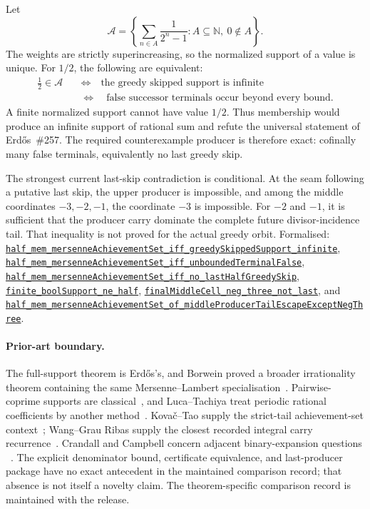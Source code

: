 \documentclass[11pt]{article}
\newcommand{\commit}{81150c1c6fdd4cd51e76d3aa0de344341e0e9e7c}
\newcommand{\repobase}{https://github.com/wcook04/plectis-lean-erdos249-257/blob/\commit}
\newcommand{\PK}{Erdos249257}
\newcommand{\lrefx}[3]{\href{\repobase/\PK/#1\#L#2}{\nolinkurl{#3}}}
\theoremstyle{definition}
\theoremstyle{remark}
\newcommand{\N}{\mathbb{N}}
\begin{document}
Let
\[
  \mathcal A=\left\{\sum_{n\in A}\frac1{2^n-1}:A\subseteq\N,\ 0\notin A\right\}.
\]
The weights are strictly superincreasing, so the normalized support of a value
is unique.  For \(1/2\), the following are equivalent:
\[
\begin{aligned}
\frac12\in\mathcal A
&\quad\Longleftrightarrow\quad
\text{the greedy skipped support is infinite}\\
&\quad\Longleftrightarrow\quad
\text{false successor terminals occur beyond every bound}.
\end{aligned}
\]
A finite normalized support cannot have value \(1/2\).  Thus membership would
produce an infinite support of rational sum and refute the universal statement
of Erd\H{o}s~\#257.  The required counterexample producer is therefore exact:
cofinally many false terminals, equivalently no last greedy skip.

The strongest current last-skip contradiction is conditional.  At the seam
following a putative last skip, the upper producer is impossible, and among
the middle coordinates \(-3,-2,-1\), the coordinate \(-3\) is impossible.
For \(-2\) and \(-1\), it is sufficient that the producer carry dominate the
complete future divisor-incidence tail.  That inequality is not proved for
the actual greedy orbit.  Formalised:
\lrefx{GreedyAchievementSet.lean}{2514}{half_mem_mersenneAchievementSet_iff_greedySkippedSupport_infinite},
\lrefx{HalfCylinderHalfMembershipClassification.lean}{126}{half_mem_mersenneAchievementSet_iff_unboundedTerminalFalse},
\lrefx{HalfCylinderHalfMembershipClassification.lean}{235}{half_mem_mersenneAchievementSet_iff_no_lastHalfGreedySkip},
\lrefx{HalfCarryReachability.lean}{589}{finite_boolSupport_ne_half},
\lrefx{HalfCylinderFinalMiddleCellEscape.lean}{587}{finalMiddleCell_neg_three_not_last},
and
\lrefx{HalfCylinderLastProducerContradiction.lean}{387}{half_mem_mersenneAchievementSet_of_middleProducerTailEscapeExceptNegThree}.

\paragraph{Prior-art boundary.}
The full-support theorem is Erd\H{o}s's, and Borwein proved a broader
irrationality theorem containing the same Mersenne--Lambert
specialisation~\cite{erdos1948,borwein1992}.  Pairwise-coprime supports are
classical~\cite{erdos1968}, and Luca--Tachiya treat periodic rational
coefficients by another method~\cite{lucatachiya}.  Kova\v{c}--Tao supply the
strict-tail achievement-set context~\cite{kovactao}; Wang--Grau Ribas supply
the closest recorded integral carry recurrence~\cite{wanggrauribas}.
Crandall and Campbell concern adjacent binary-expansion questions
~\cite{crandall,campbell}.  The explicit denominator bound, certificate
equivalence, and last-producer package have no exact antecedent in the
maintained comparison record; that absence is not itself a novelty claim.
The theorem-specific comparison record is maintained with the release.
\end{document}

